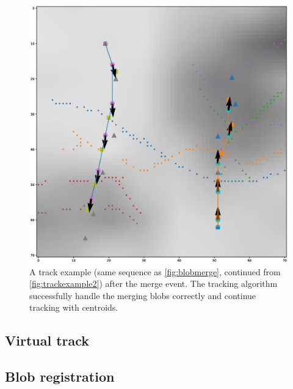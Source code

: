 \begin{figure}
  \centering
  \includegraphics[width=\textwidth]{figures/trackexample2_2.eps}
  \caption{A track example (same sequence as \autoref{fig:blobmerge}, continued from \autoref{fig:trackexample2}) after the merge event. The tracking algorithm successfully handle the merging blobs correctly and continue tracking with centroids.}\label{fig:trackexample2_2}
\end{figure}

\subsection{Virtual track}
\subsection{Blob registration}

